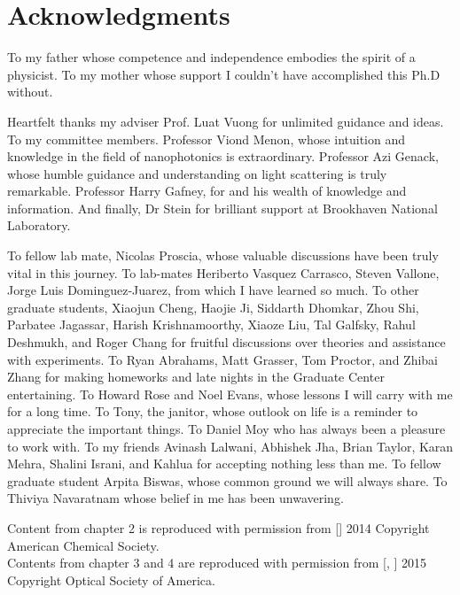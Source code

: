 \nobibliography*
\chapter*{Acknowledgments}

To my father whose competence and independence embodies the spirit of a physicist. To my mother whose support I couldn't have accomplished this Ph.D without.

Heartfelt thanks my adviser Prof. Luat Vuong for unlimited guidance and ideas.
To my committee members. Professor Viond Menon, whose intuition and knowledge in the field of nanophotonics is extraordinary.
Professor Azi Genack, whose humble guidance and understanding on light scattering is truly remarkable.
Professor Harry Gafney, for and his wealth of knowledge and information.
And finally, Dr Stein for brilliant support at Brookhaven National Laboratory. 

To fellow lab mate, Nicolas Proscia, whose valuable discussions have been truly vital in this journey. 
To lab-mates Heriberto Vasquez Carrasco, Steven Vallone, Jorge Luis Dominguez-Juarez, from which I have learned so much.
To other graduate students, Xiaojun Cheng, Haojie Ji, Siddarth Dhomkar, Zhou Shi, Parbatee Jagassar, Harish Krishnamoorthy, Xiaoze Liu, Tal Galfsky, Rahul Deshmukh, and Roger Chang for fruitful discussions over theories and assistance with experiments.
To Ryan Abrahams, Matt Grasser, Tom Proctor, and Zhibai Zhang for making homeworks and late nights in the Graduate Center entertaining.
To Howard Rose and Noel Evans, whose lessons I will carry with me for a long time.
To Tony, the janitor, whose outlook on life is a reminder to appreciate the important things. To Daniel Moy who has always been a pleasure to work with.
To my friends Avinash Lalwani, Abhishek Jha, Brian Taylor, Karan Mehra, Shalini Israni, and Kahlua for accepting nothing less than me.
To fellow graduate student Arpita Biswas, whose common ground we will always share.
To Thiviya Navaratnam whose belief in me has been unwavering.


Content from chapter 2 is reproduced with permission from [] 2014 Copyright American Chemical Society.\\
Contents from chapter 3 and 4 are reproduced with permission from [, ] 2015 Copyright Optical Society of America.